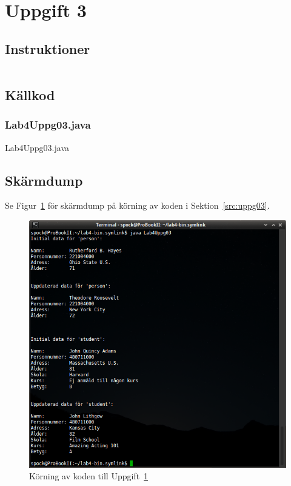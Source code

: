 \section{Uppgift 3}\label{sec:uppg03}

\subsection{Instruktioner}
\begin{Verbatim}[fontsize=\small]
% TODO: Lägg till instruktioner
\end{Verbatim}


\subsection{Källkod}
\subsubsection{Lab4Uppg03.java}
\caption{Lab4Uppg03.java}
\label{src:uppg03}

\subsection{Skärmdump}
Se Figur~\ref{fig:uppg03-screenshot} för skärmdump på körning av koden i
Sektion~\ref{src:uppg03}.

\begin{figure}[htbp]
\centering
\includegraphics[width=\linewidth]{img/03.png}
\caption{Körning av koden till Uppgift~\ref{sec:uppg03}}
\label{fig:uppg03-screenshot}
\end{figure}

